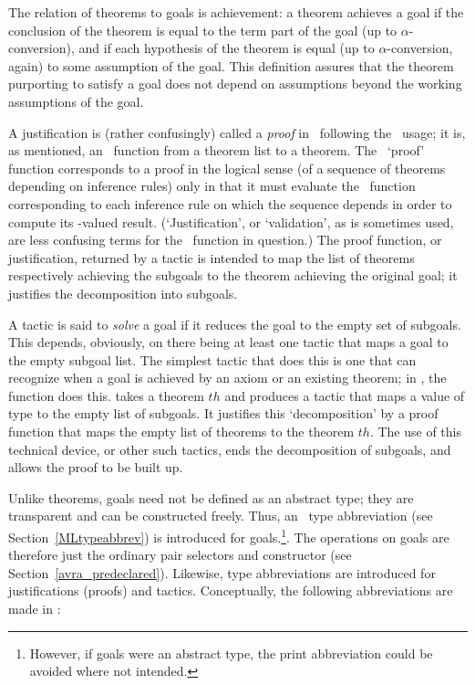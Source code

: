 The relation of theorems
to goals is achievement:
 a theorem achieves a goal if the conclusion
of the theorem is equal to the term part of the goal
(up to $\alpha$-conversion), and if each hypothesis of the theorem
is equal (up to $\alpha$-conversion, again) to some assumption of the
goal. This definition assures that the theorem purporting to satisfy a goal
does not depend on assumptions beyond the
working assumptions of the goal.

A justification is (rather confusingly) called
a {\it proof\/}
in \HOL\, following the \LCF\ usage; it is, as mentioned,
an \ML\ function
from a theorem list to a theorem.  The \ML\ `proof' function 
corresponds to a proof
 in the
logical sense (of a sequence of theorems depending on inference rules)
only in that it must
evaluate the \ML\ function corresponding
to each inference rule on which the sequence depends 
in order to compute its -valued result. (`Justification', or
`validation',
 as is sometimes used, are less confusing terms for
the \ML\ function in question.)
The proof function, or justification, returned by a tactic is intended to map the
list of theorems respectively achieving the subgoals to the
theorem achieving the original goal; it justifies the decomposition
into subgoals.

A tactic is said to {\it solve\/}
 a goal if it reduces the goal to the
empty set of subgoals. 
This depends, obviously, on there being at least one
tactic that maps a goal to the empty subgoal list.  The simplest
tactic that does this is one that can recognize when a goal is
achieved by an axiom or an existing theorem; in \HOL, the function
 does this.  takes a theorem $th$
and produces a tactic that maps a value
of type  to the empty list of subgoals. It justifies this
`decomposition' by a proof function that maps the empty list of theorems
to the theorem $th$. The use of this technical device, or other
such tactics, ends the decomposition of subgoals, and allows the proof
to be built up.

Unlike theorems, goals need not be defined as an abstract type;
they are transparent and can be constructed freely. Thus, an \ML\
type abbreviation (see Section~\ref{MLtypeabbrev}) is introduced 
for goals.\footnote{However,
if goals were an abstract type, the print
abbreviation could be avoided where not intended.}. 
The operations on goals are therefore just the ordinary
pair selectors and constructor (see Section~\ref{avra_predeclared}).
Likewise, type abbreviations are introduced for justifications (proofs)
and tactics. Conceptually, the following abbreviations are made in \HOL:

